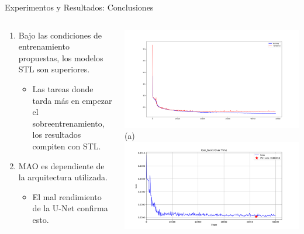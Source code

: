 \documentclass[xcolor=dvipsnames,table]{beamer}
\begin{document}
\begin{frame}{Experimentos y Resultados: Conclusiones}
	\begin{columns}[T]
		
		\vspace{-0.4cm}
		\begin{block}{}
			\begin{enumerate}
				\item Bajo las condiciones de entrenamiento propuestas, los modelos STL son superiores.
				\begin{itemize}
					\item Las tareas donde tarda más en empezar el sobreentrenamiento, los resultados compiten con STL.
				\end{itemize}
				\item MAO es dependiente de la arquitectura utilizada.
				\begin{itemize}
					\item El mal rendimiento de la U-Net confirma esto.
				\end{itemize}
			\end{enumerate}
		\end{block}
		
		\vspace{-0.3cm}
		\begin{minipage}[t]{\textwidth}
			\begin{columns}[c]
				\centering
				\includegraphics[width=\textwidth]{my_images/DL/learning_curves.png}\\[-2mm]
				
				{\scriptsize (a)}
				\centering
				\includegraphics[width=\textwidth]{my_images/DL/loss_task1_plot.png}\\[-2mm]
				

\end{columns}
\end{minipage}
\end{columns}
\end{frame}
\end{document}
